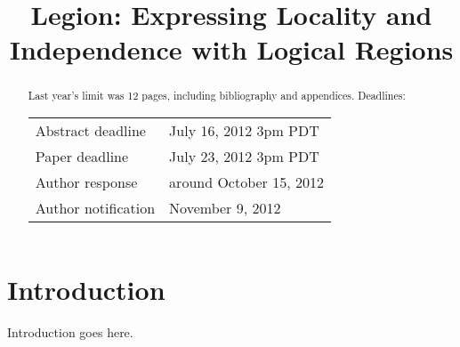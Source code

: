 \documentclass{sig-alternate}
\begin{document}
\title{Legion: Expressing Locality and Independence with Logical Regions}
\author{}
\maketitle

\begin{abstract}
Last year's limit was 12 pages, including bibliography and appendices.
Deadlines:
\begin{tabular}{ll}
Abstract deadline & July 16, 2012 3pm PDT \\
Paper deadline & July 23, 2012 3pm PDT \\
Author response & around October 15, 2012 \\
Author notification & November 9, 2012
\end{tabular}
\end{abstract}

\section{Introduction}
\label{sect:intro}
Introduction goes here.



{
\small

}
\end{document}
